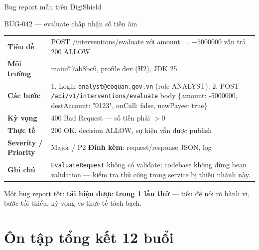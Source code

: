 \documentclass[aspectratio=169,12pt]{beamer}
\begin{document}
\begin{frame}{Bug report mẫu trên DigiShield}
  \small
  \begin{exampleblock}{BUG-042 --- evaluate chấp nhận số tiền âm}
    \footnotesize
    \begin{tabular}{@{}p{}p{}@{}}
      \textbf{Tiêu đề} & POST /interventions/evaluate với amount $= -5000000$ vẫn trả 200 ALLOW \\
      \textbf{Môi trường} & main@7ab8bc6, profile dev (H2), JDK 25 \\
      \textbf{Các bước} & 1. Login \texttt{analyst@coquan.gov.vn} (role ANALYST). 2. POST \texttt{/api/v1/interventions/evaluate} body \{amount: -5000000, destAccount: "0123", onCall: false, newPayee: true\} \\
      \textbf{Kỳ vọng} & 400 Bad Request --- số tiền phải $> 0$ \\
      \textbf{Thực tế} & 200 OK, decision ALLOW, sự kiện vẫn được publish \\
      \textbf{Severity / Priority} & Major / P2 \quad \textbf{Đính kèm}: request/response JSON, log \\
      \textbf{Ghi chú} & \texttt{EvaluateRequest} không có validate; codebase không dùng bean validation --- kiểm tra thủ công trong service bị thiếu nhánh này. \\
    \end{tabular}
  \end{exampleblock}
  \small Một bug report tốt: \textbf{tái hiện được trong 1 lần thử} --- tiêu đề nói rõ hành vi, bước tối thiểu, kỳ vọng vs thực tế tách bạch.
\end{frame}

\section{Ôn tập tổng kết 12 buổi}
\end{document}
